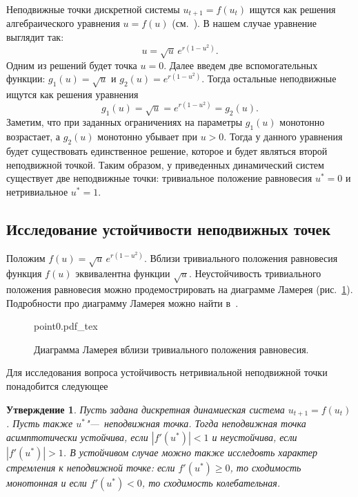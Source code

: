 \documentclass[12pt, a4paper]{article} %
\newcommand{\incfig}[1]{%
    \def\svgwidth{\columnwidth}
    {#1.pdf_tex}
}
\renewcommand{\ge}{\geqslant}
\newtheorem{St}[Th]{Утверждение}
\begin{document}
Неподвижные точки дискретной системы $u_{t+1}=f(u_t)$ ищутся как решения
алгебраического уравнения $u = f(u)$ (см.~\cite{Bratus}).
В нашем случае уравнение выглядит так:
\begin{equation}
    u = \sqrt{u}\,e^{r(1 - u^2)}
.\end{equation}
Одним из решений будет точка $u = 0$.
Далее введем две вспомогательных функции:  $g_1(u) = \sqrt{u}$ и 
$g_2(u) = e^{r(1 - u^2)}$.
Тогда остальные неподвижные ищутся как решения уравнения 
\begin{equation}
    g_1(u) = \sqrt{u}= e^{r(1 - u^2)} = g_2(u)
.\end{equation} 
Заметим, что при заданных ограничениях на параметры $g_1(u)$ монотонно 
возрастает, а  $g_2(u)$ монотонно убывает при  $u > 0$.
Тогда у данного уравнения будет существовать единственное решение, 
которое и будет являться второй неподвижной точкой. 
Таким образом, у приведенных динамический систем существует две неподвижные 
точки: тривиальное положение равновесия $u^* = 0$ и нетривиальное  $u^*=1$. 

\subsection{Исследование устойчивости неподвижных точек}

Положим $f(u) = \sqrt{u}\,e^{r(1 - u^2)}$.
Вблизи тривиального положения равновесия функция $f(u)$ эквивалентна функции 
$\sqrt{u}$. 
Неустойчивость тривиального положения равновесия можно продемострировать
на диаграмме Ламерея (рис.~\ref{fig:point0}). 
Подробности про диаграмму Ламерея можно найти в~\cite[с.~72]{Bratus}.

\begin{figure}[ht]
    \centering
    \incfig{point0}
    \caption{Диаграмма Ламерея вблизи тривиального положения равновесия.}
    \label{fig:point0}
\end{figure}

Для исследования вопроса устойчивость нетривиальной неподвижной точки 
понадобится следующее 

\begin{St}
    Пусть задана дискретная динамиеская система $u_{t+1} = f(u_t)$.
    Пусть также $u^*$"---~неподвижная точка.
    Тогда неподвижная точка асимптотически устойчива, если 
    $\left| f'(u^*) \right| < 1$ и неустойчива, если $\left| f'(u^*) \right| > 1$.
    В устойчивом случае можно также исследовть характер стремления к неподвижной точке: если $f'(u^*) \ge 0$, то сходимость монотонная и если  $f'(u^*) < 0$, то сходимость колебательная.
\end{St} 
\end{document}
